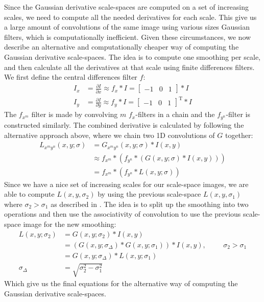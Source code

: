 \documentclass[thesis.tex]{subfiles}
\begin{document}
Since the Gaussian derivative scale-spaces are computed on a set of increasing scales, we need to compute all the needed derivatives for each scale. This give us a large amount of convolutions of the same image using various sizes Gaussian filters, which is computationally inefficient. Given these circumstances, we now describe an alternative and computationally cheaper way of computing the Gaussian derivative scale-spaces. The idea is to compute one smoothing per scale, and then calculate all the derivatives at that scale using finite differences filters. We first define the central differences filter $f$:
%
\begin{align*}
	I_x &= \frac{\partial I}{\partial x} \approx f_x \ast I = \begin{bmatrix} -1 & 0 & 1\end{bmatrix} \ast I \\
	I_y &= \frac{\partial I}{\partial y} \approx f_y \ast I = \begin{bmatrix} -1 & 0 & 1\end{bmatrix}^\text{T} \ast I
\end{align*}
%
The $f_{x^m}$ filter is made by convolving $m$ $f_x$-filters in a chain and the $f_{y^n}$-filter is constructed similarly. The combined derivative is calculated by following the alternative approach above, where we chain two 1D convolutions of $G$ together:
%
\begin{align*}
	L_{x^m y^n}(x,y;\sigma) &= G_{x^m y^n}(x,y;\sigma) \ast I(x,y) \\
		&\approx f_{x^m} \ast \left( f_{y^n} \ast \left (G(x,y;\sigma) \ast I(x,y) \right) \right) \\
		&= f_{x^m} \ast \left( f_{y^n} \ast L(x,y;\sigma) \right)
\end{align*}
%
Since we have a nice set of increasing scales for our scale-space images, we are able to compute $L(x,y,\sigma_2)$ by using the previous scale-space $L(x,y,\sigma_1)$ where $\sigma_2 > \sigma_1$ as described in \cite{tola2008fast}. The idea is to split up the smoothing into two operations and then use the associativity of convolution to use the previous scale-space image for the new smoothing:
%
\begin{align*}
	L(x,y;\sigma_2) &= G(x,y;\sigma_2) \ast I(x,y) \\
					&= (G(x,y;\sigma_\Delta) \ast G(x,y;\sigma_1)) \ast I(x,y),\hspace{1cm}\sigma_2 > \sigma_1 \\
					&= G(x,y;\sigma_\Delta) \ast L(x,y;\sigma_1) \\
			 \sigma_\Delta &= \sqrt{\sigma_2^2 - \sigma_1^2}
\end{align*}
%
Which give us the final equations for the alternative way of computing the Gaussian derivative scale-spaces.
\end{document}
